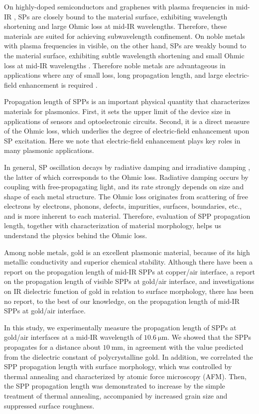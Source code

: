 \documentclass[aip,apl,reprint]{revtex4-1}
\begin{document}
On highly-doped semiconductors and graphenes with plasma frequencies in mid-IR \cite{Law}, SPs are closely bound to the material surface, exhibiting wavelength shortening and large Ohmic loss at mid-IR wavelengths. Therefore, these materials are suited for achieving subwavelength confinement. On noble metals with plasma frequencies in visible, on the other hand,
 SPs are weakly bound to the material surface, exhibiting subtle wavelength shortening and small Ohmic loss at mid-IR wavelengths . Therefore noble metals are advantageous in applications where any of small loss, long propagation length, and large electric-field enhancement is required \cite{Law, Kusa2014}.

Propagation length of SPPs is an important physical quantity that characterizes materials for plasmonics. First, it sets the upper limit of the device size in applications of sensors and optoelectronic circuits. Second, it is a direct measure of the Ohmic loss, which underlies the degree of electric-field enhancement upon SP excitation. Here we note that electric-field enhancement plays key roles in many plasmonic applications. 

In general, SP oscillation decays by radiative damping and irradiative damping \cite{Link}, the latter of which corresponds to the Ohmic loss. Radiative damping occurs by coupling with free-propagating light, and its rate strongly depends on size and shape of each metal structure. The Ohmic loss originates from scattering of free electrons by electrons, phonons, defects, impurities, surfaces, boundaries, etc., and is more inherent to each material. Therefore, evaluation of SPP propagation length, together with characterization of material morphology, helps us understand the physics behind the Ohmic loss.

Among noble metals, gold is an excellent plasmonic material, because of its high metallic conductivity and superior chemical stability\cite{Zayats}. Although there have been a report on the propagation length of mid-IR SPPs at copper/air interface\cite{Shiba}, a report on the propagation length of visible SPPs at gold/air interface\cite{Kuttge}, and investigations on IR dielectric function of gold in relation to surface morphology\cite{Trollmann, Yang}, there has been no report, to the best of our knowledge, on the propagation length of mid-IR SPPs at gold/air interface.

In this study, we experimentally measure the propagation length of SPPs at gold/air interfaces at a mid-IR wavelength of $10.6\:\mathrm{\mu m}$. We showed that the SPPs propagates for a distance about $10\:\mathrm{mm}$, in agreement with the value predicted from the dielectric constant of polycrystalline gold. In addition, we correlated the SPP propagation length with surface morphology, which was controlled by thermal annealing and characterized by atomic force microscopy (AFM). Then, the SPP propagation length was demonstrated to increase by the simple treatment of thermal annealing, accompanied by increased grain size and suppressed surface roughness.
\end{document}

